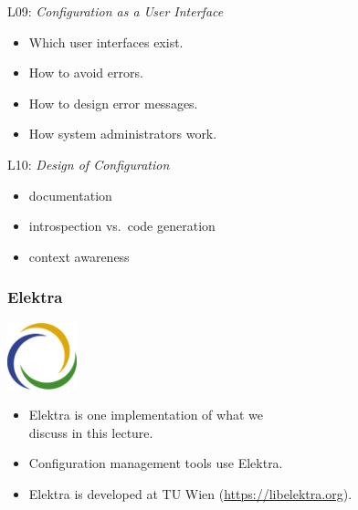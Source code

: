 \begin{frame}
	L09: \textit{Configuration as a User Interface}
	\begin{itemize}
		\item Which user interfaces exist.
		\item How to avoid errors.
		\item How to design error messages.
		\item How system administrators work.
	\end{itemize}
\end{frame}

\begin{frame}
	L10: \textit{Design of Configuration}
	\begin{itemize}
		\item documentation
		\item introspection vs.\ code generation
		\item context awareness
	\end{itemize}
\end{frame}


\begin{frame}
	\frametitle{Elektra}
	\hfill \includegraphics[width=2cm]{../figures/logo}
	\vspace{-1cm}
	\begin{itemize}
		\item Elektra is one implementation of what we \\ discuss in this lecture.
		\item Configuration management tools use Elektra.
		\item Elektra is developed at TU Wien (\url{https://libelektra.org}).
	\end{itemize}
\end{frame}

